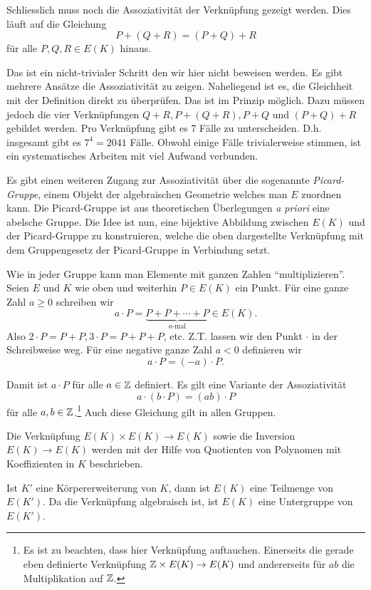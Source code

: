 Schliesslich muss noch die Assoziativität der Verknüpfung gezeigt
werden. Dies läuft auf die Gleichung
$$
P + (Q + R) = (P+Q)+R$$
für alle $P,Q,R\in E(K)$ hinaus.

Das ist ein nicht-trivialer Schritt den wir hier nicht beweisen
werden. Es gibt mehrere Ansätze die Assoziativität zu zeigen.
Naheliegend ist es, die Gleichheit mit der Definition direkt zu
überprüfen. Das ist im Prinzip möglich. Dazu müssen jedoch die vier
Verknüpfungen $Q+R, P+(Q+R), P+Q$ und $(P+Q)+R$ gebildet werden.
Pro Verknüpfung gibt es $7$ Fälle zu unterscheiden. D.h. insgesamt gibt
es $7^4= 2041$ Fälle. Obwohl einige Fälle trivialerweise stimmen, ist
ein systematisches Arbeiten mit viel Aufwand verbunden.


Es gibt einen weiteren Zugang zur Assoziativität über die sogenannte
 \emph{Picard-Gruppe}, einem  Objekt der algebraischen Geometrie
welches man $E$ zuordnen kann. Die Picard-Gruppe ist aus theoretischen
Überlegungen \textit{a priori} eine abelsche Gruppe. Die Idee ist nun, eine
bijektive Abbildung zwischen $E(K)$ und der Picard-Gruppe zu
konstruieren, welche die oben dargestellte Verknüpfung mit dem
Gruppengesetz der Picard-Gruppe in Verbindung setzt.


Wie in jeder Gruppe kann man Elemente mit ganzen Zahlen
``multiplizieren''. Seien $E$ und $K$ wie oben und weiterhin $P\in
E(K)$ ein Punkt. Für eine ganze Zahl $a\ge 0$ schreiben wir
\begin{equation}
  \label{eq:amultP}
  a\cdot P = \underbrace{P+ P+\cdots +P}_{\text{$a$-mal}} \in E(K).
\end{equation}
Also $2\cdot P = P+P, 3\cdot P = P+P+P$, etc. Z.T. lassen wir den
Punkt $\cdot$ in der Schreibweise weg. 
Für eine negative ganze Zahl $a<0$ definieren wir
\begin{equation*}
  a\cdot P = (-a) \cdot P. 
\end{equation*}

Damit ist $a\cdot P$ für alle $a\in{\mathbb{Z}}$ definiert. Es gilt eine
Variante der Assoziativität
\begin{equation}
  \label{eq:actionofZ}
  a \cdot (b\cdot P) = (ab)\cdot P 
\end{equation}
für alle $a,b\in{\mathbb{Z}}$.\footnote{Es ist zu beachten, dass hier
  Verknüpfung auftauchen. Einerseits die gerade eben definierte
  Verknüpfung ${\mathbb{Z}}\times E(K)\rightarrow E(K)$ und andererseits für
  $ab$ die
  Multiplikation auf ${\mathbb{Z}}$.} Auch diese Gleichung gilt in allen Gruppen.

\begin{bemerkung}
  Die Verknüpfung $E(K)\times
  E(K)\rightarrow E(K)$ sowie die Inversion $E(K)\rightarrow E(K)$
  werden mit der Hilfe von 
  Quotienten von Polynomen mit Koeffizienten in $K$ beschrieben.

  Ist $K'$ eine Körpererweiterung von $K$, dann ist $E(K)$ eine
  Teilmenge von $E(K')$. Da die Verknüpfung algebraisch ist, ist
  $E(K)$ eine Untergruppe von $E(K')$.
\end{bemerkung}

